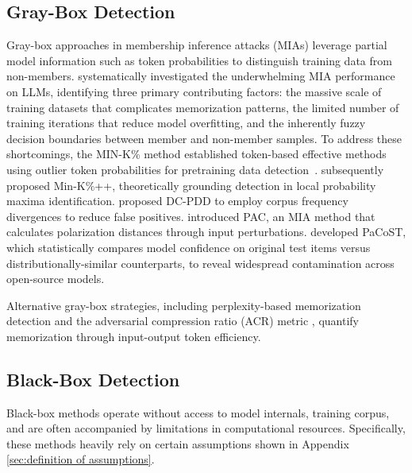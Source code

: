 \subsection{Gray-Box Detection}
Gray-box approaches in membership inference attacks (MIAs) leverage partial model information such as token probabilities to distinguish training data from non-members. \citet{duan2024membership} systematically investigated the underwhelming MIA performance on LLMs, identifying three primary contributing factors: the massive scale of training datasets that complicates memorization patterns, the limited number of training iterations that reduce model overfitting, and the inherently fuzzy decision boundaries between member and non-member samples. To address these shortcomings, the MIN-K\% method established token-based effective methods using outlier token probabilities for pretraining data detection~\cite{shi2024detectingpretrainingdatalarge}. \citet{zhang2024minkimprovedbaselinedetecting} subsequently proposed Min-K\%++, theoretically grounding detection in local probability maxima identification. \citet{zhang-etal-2024-pretraining} proposed DC-PDD to employ corpus frequency divergences to reduce false positives. \citet{ye-etal-2024-data} introduced PAC, an MIA method that calculates polarization distances through input perturbations. \citet{zhang-etal-2024-pacost} developed PaCoST, which statistically compares model confidence on original test items versus distributionally-similar counterparts, to reveal widespread contamination across open-source models.

Alternative gray-box strategies, including perplexity-based memorization detection \cite{li2023estimatingcontaminationperplexityquantifying} and the adversarial compression ratio (ACR) metric \cite{schwarzschild2024rethinkingllmmemorizationlens}, quantify memorization through input-output token efficiency.

\subsection{Black-Box Detection}



Black-box methods operate without access to model internals, training corpus, and are often accompanied by limitations in computational resources.
Specifically, these methods heavily rely on certain assumptions shown in Appendix \ref{sec:definition of assumptions}.



